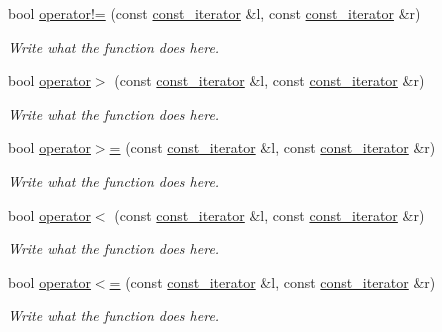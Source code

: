 \begin{DoxyCompactItemize}
bool \hyperlink{classcircularDeque_1_1const__iterator_af9237358f8dba2a676cc09f2ae028e0e}{operator!=} (const \hyperlink{classcircularDeque_1_1const__iterator}{const\+\_\+iterator} \&l, const \hyperlink{classcircularDeque_1_1const__iterator}{const\+\_\+iterator} \&r)
\begin{DoxyCompactList}\small\item\em Write what the function does here. \end{DoxyCompactList}\item 
bool \hyperlink{classcircularDeque_1_1const__iterator_ae3fcb1c6db8f72c42e0830aa4d8a5bd9}{operator$>$} (const \hyperlink{classcircularDeque_1_1const__iterator}{const\+\_\+iterator} \&l, const \hyperlink{classcircularDeque_1_1const__iterator}{const\+\_\+iterator} \&r)
\begin{DoxyCompactList}\small\item\em Write what the function does here. \end{DoxyCompactList}\item 
bool \hyperlink{classcircularDeque_1_1const__iterator_ab9e286a09c563b3cc6464fce11884a0e}{operator$>$=} (const \hyperlink{classcircularDeque_1_1const__iterator}{const\+\_\+iterator} \&l, const \hyperlink{classcircularDeque_1_1const__iterator}{const\+\_\+iterator} \&r)
\begin{DoxyCompactList}\small\item\em Write what the function does here. \end{DoxyCompactList}\item 
bool \hyperlink{classcircularDeque_1_1const__iterator_a0ff653fe6b36c48d70e1d4fd88fb80c7}{operator$<$} (const \hyperlink{classcircularDeque_1_1const__iterator}{const\+\_\+iterator} \&l, const \hyperlink{classcircularDeque_1_1const__iterator}{const\+\_\+iterator} \&r)
\begin{DoxyCompactList}\small\item\em Write what the function does here. \end{DoxyCompactList}\item 
bool \hyperlink{classcircularDeque_1_1const__iterator_a9bfb32fe108f74ef4d6d9ef242ef9751}{operator$<$=} (const \hyperlink{classcircularDeque_1_1const__iterator}{const\+\_\+iterator} \&l, const \hyperlink{classcircularDeque_1_1const__iterator}{const\+\_\+iterator} \&r)
\begin{DoxyCompactList}\small\item\em Write what the function does here. \end{DoxyCompactList}\end{DoxyCompactItemize}


